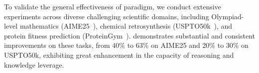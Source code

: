 
To validate the general effectiveness of \method{} paradigm, we conduct extensive experiments across diverse challenging scientific domains, including Olympiad-level mathematics (AIME25~\cite{aime2025problems}), chemical retrosynthesis (USPTO50k~\cite{schneider2016s}), and protein fitness prediction (ProteinGym~\cite{notin2023proteingym}). \method{} demonstrates substantial and consistent improvements on these tasks, from 40\% to 63\% on AIME25 and 20\% to 30\% on USPTO50k, exhibiting great enhancement in the capacity of reasoning and knowledge leverage. 



